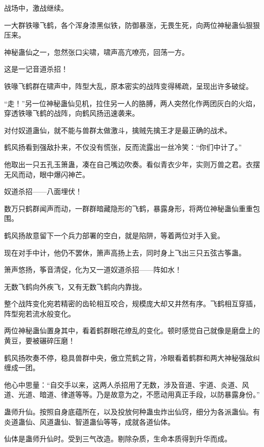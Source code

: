 
\begin{this_body}

战场中，激战继续。

一大群铁喙飞鹤，各个浑身漆黑似铁，防御暴涨，无畏生死，向两位神秘蛊仙狠狠压来。

神秘蛊仙之一，忽然张口尖啸，啸声高亢嘹亮，回荡一方。

这是一记音道杀招！

铁喙飞鹤群在啸声中，阵型大乱，原本密实的战阵变得稀疏，呈现出许多破绽。

“走！”另一位神秘蛊仙见机，拉住另一人的胳膊，两人突然化作两团灰白的火焰，穿透铁喙飞鹤的战阵，向鹤风扬迅速袭来。

对付奴道蛊仙，就不能与兽群太做激斗，擒贼先擒王才是最正确的战术。

鹤风扬看到强敌扑来，不仅没有慌张，反而流露出一丝冷笑：“你们中计了。”

他取出一只五孔玉箫蛊，凑在自己嘴边吹奏。看似青衣少年，实则万兽之君。衣摆无风而动，眼中爆闪神芒。

奴道杀招——八面埋伏！

数万只鹤群闻声而动，一群群暗藏隐形的飞鹤，暴露身形，将两位神秘蛊仙重重包围。

鹤风扬故意留下一个兵力部署的空白，就是陷阱，等着两位对手入瓮。

现在对手中计，他仍不罢休，箫声高扬上去，同时身上飞出三只五弦古筝蛊。

箫声悠扬，筝音清促，化为又一道奴道杀招——阵如水！

无数飞鹤向外疾飞，又有无数飞鹤向内靠拢。

整个战阵变化宛若精密的齿轮相互咬合，规模庞大却又井然有序。飞鹤相互穿插，阵型宛若流水般变化。

两位神秘蛊仙置身其中，看着鹤群眼花缭乱的变化。顿时感觉自己就像是磨盘上的黄豆，要被碾碎压磨！

鹤风扬吹奏不停，稳具兽群中央，傲立荒鹤之背，冷眼看着鹤群和两大神秘强敌纠缠成一团。

他心中思量：“自交手以来，这两人杀招用了无数，涉及音道、宇道、炎道、风道、光道、暗道、律道等等。乃是故意为之，不愿动用真正手段，以防暴露身份。”

蛊师升仙。按照自身底蕴所在，以及投放何种蛊虫炸出仙窍，细分为各派蛊仙。有炎道蛊仙、风道蛊仙、智道蛊仙等等，成就各道仙体。

仙体是蛊师升仙时。受到三气改造。剔除杂质，生命本质得到升华而成。


\end{this_body}
